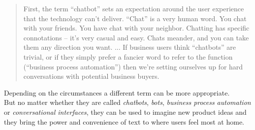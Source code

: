 \begin{quote}
First, the term “chatbot” sets an expectation around the user experience that the technology can’t deliver.
“Chat” is a very human word.
You chat with your friends.
You have chat with your neighbor.
Chatting has specific connotations – it’s very casual and easy.
Chats meander, and you can take them any direction you want.
...
If business users think “chatbots” are trivial, or if they simply prefer a fancier word to refer to the function (“business process automation”) then we’re setting ourselves up for hard conversations with potential business buyers.
\end{quote}

Depending on the circumstances a different term can be more appropriate.
\\

But no matter whether they are called \emph{chatbots}, \emph{bots}, \emph{business process automation} or \emph{conversational interfaces},
they can be used to imagine new product ideas and they bring the power and convenience of text to where users feel most at home.

